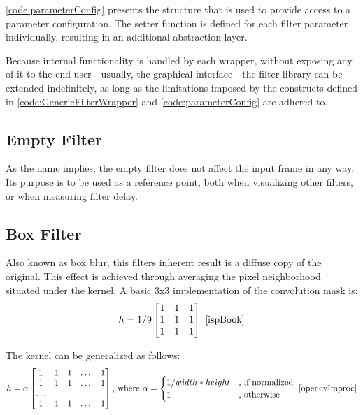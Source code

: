 \cref{code:parameterConfig} presents the structure that is used to provide access to a parameter
configuration. The setter function is defined for each filter parameter individually, resulting in an
additional abstraction layer.

Because internal functionality is handled by each wrapper, without exposing any of it to the end
user - usually, the graphical interface - the filter library can be extended indefinitely, as long as
the limitations imposed by the constructs defined in \cref{code:GenericFilterWrapper} and
\cref{code:parameterConfig} are adhered to.

\subsection{Empty Filter}

As the name implies, the empty filter does not affect the input frame in any way. Its purpose is to be
used as a reference point, both when visualizing other filters, or when measuring filter delay.

\subsection{Box Filter}

Also known as box blur, this filters inherent result is a diffuse copy of the original. This effect is
achieved through averaging the pixel neighborhood situated under the kernel. A basic 3x3 implementation
of the convolution mask is:
\begin{equation}
	h = 1/9
	\begin{bmatrix}
		1 & 1 & 1 \\
		1 & 1 & 1 \\
		1 & 1 & 1 \\
	\end{bmatrix}
	\text{ \cite{ispBook}}
\end{equation}

The kernel can be generalized as follows:
\begin{equation}
	\label{eq:boxFilterFormula}
	h = \alpha
	\begin{bmatrix}
		1 & 1 & 1 & \dots & 1 \\
		1 & 1 & 1 & \dots & 1 \\
		\dots                 \\
		1 & 1 & 1 & \dots & 1 \\
	\end{bmatrix}
	\text{, where }
	\alpha =
	\begin{cases}
		1 / width * height & \text{, if normalized} \\
		1                  & \text{, otherwise}     \\
	\end{cases}
	\text{ \cite{opencvImproc}}
\end{equation}

